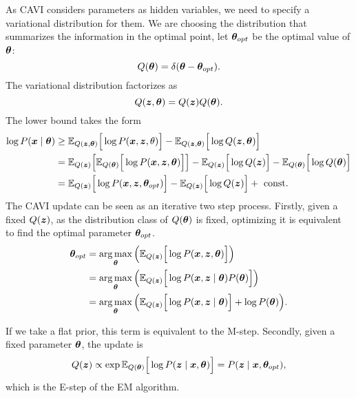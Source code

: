 As CAVI considers parameters as hidden variables, we need to specify a variational distribution for them. We are choosing the distribution that summarizes the information in the optimal point, let \(\bm{\theta}_{opt}\) be the optimal value of \(\bm{\theta}\):
\[
  Q(\bm{\theta}) = \delta(\bm{\theta} - \bm{\theta}_{opt}).
\]
The variational distribution factorizes as
\[
  Q(\bm{z}, \bm{\theta}) = Q(\bm{z})Q(\bm{\theta}).
\]
The lower bound takes the form
\[
  \begin{aligned}
    \log{P(\bm{x}\mid \bm{\theta})} &\geq \mathbb{E}_{Q(\bm{z}, \bm{\theta})}\Big[\log{P(\bm{x}, \bm{z}, \theta)}\Big] - \mathbb{E}_{Q(\bm{z}, \bm{\theta})}\Big[\log{Q(\bm{z}, \bm{\theta})}\Big] \\
    &= \mathbb{E}_{Q(\bm{z})}\Big[\mathbb{E}_{Q(\bm{\theta})}\Big[\log{P(\bm{x}, \bm{z}, \bm{\theta})}\Big]\Big] - \mathbb{E}_{Q(\bm{z})}\Big[\log{Q(\bm{z})}\Big] - \mathbb{E}_{Q(\bm{\theta})}\Big[\log{Q(\bm{\theta})}\Big] \\
    &= \mathbb{E}_{Q(\bm{z})}\Big[\log{P(\bm{x}, \bm{z}, \bm{\theta}_{opt})}\Big] - \mathbb{E}_{Q(\bm{z})}\Big[\log{Q(\bm{z})}\Big] + \text{ const. }
  \end{aligned}
\]
The CAVI update can be seen as an iterative two step process. Firstly, given a fixed \(Q(\bm{z})\), as the distribution class of \(Q(\bm{\theta})\) is fixed, optimizing it is equivalent to find the optimal parameter \(\bm{\theta}_{opt}\). 
\[
  \begin{aligned}
    \bm{\theta}_{opt} &= \operatorname*{arg\,max}_{\bm{\theta}} \Big( \mathbb{E}_{Q(\bm{z})}\Big[\log{P(\bm{x},\bm{z},\bm{\theta})}\Big] \Big)\\
    &=  \operatorname*{arg\,max}_{\bm{\theta}} \Big( \mathbb{E}_{Q(\bm{z})}\Big[\log{P(\bm{x}, \bm{z}\mid \bm{\theta})P(\bm{\theta})}\Big] \Big) \\
    &= \operatorname*{arg\,max}_{\bm{\theta}} \Big( \mathbb{E}_{Q(\bm{z})}\Big[\log{P(\bm{x}, \bm{z}\mid \bm{\theta})}\Big] + \log{P(\bm{\theta})} \Big). \\
  \end{aligned}
\]

If we take a flat prior, this term is equivalent to the M-step. Secondly, given a fixed parameter \(\bm{\theta}\), the update is
\[
  Q(\bm{z}) \propto \exp \mathbb{E}_{Q(\bm{\theta})}\Big[\log P(\bm{z} \mid \bm{x}, \bm{\theta})\Big] =  P(\bm{z} \mid \bm{x}, \bm{\theta}_{opt}),
\]
which is the E-step of the EM algorithm.
